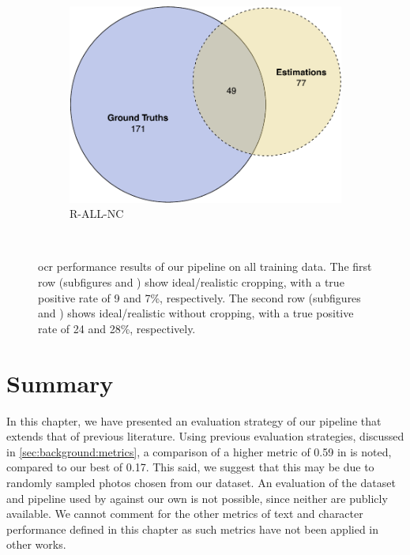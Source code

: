 \begin{figure}[h]
\begin{subfigure}[b]{0.475\textwidth}
    \includegraphics[width=\textwidth]{images/evaluation/ocr_overlap_r_all_nc}
    \caption{R-ALL-NC}
    \label{fig:evaluation:results:ocr:r_all_nc}
  \end{subfigure}
  \hspace{\fill} 
  \bigskip
  \\
  \caption[OCR performance results]{\gls{ocr} performance results of our pipeline on all training data. The first row (subfigures  and ) show ideal/realistic cropping, with a true positive rate of 9 and 7\%, respectively. The second row (subfigures  and ) shows ideal/realistic without cropping, with a true positive rate of 24 and 28\%, respectively.}
  \label{fig:evaluation:results:ocr}
\end{figure}

\clearpage
\section{Summary}

In this chapter, we have presented an evaluation strategy of our pipeline that extends that of previous literature. Using previous evaluation strategies, discussed in \cref{sec:background:metrics}, a comparison of a higher \fscore{} metric of 0.59 in \citet{Benami:2012jf} is noted, compared to our best of 0.17. This said, we suggest that this may be due to randomly sampled photos chosen from our dataset. An evaluation of the dataset and pipeline used by \citeauthor{Benami:2012jf} against our own is not possible, since neither are publicly available. We cannot comment for the other metrics of text and character performance defined in this chapter as such metrics have not been applied in other works. 

